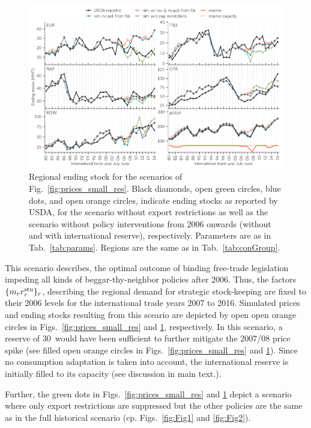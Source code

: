 \begin{figure}[htbp]
  \centering \includegraphics[width=.8\textwidth]{plots/no_policies_after_2006/Ending_stocks__MMT__1980_2017}
  \caption{Regional ending stock for the scenarios of Fig.~\ref{fig:prices_small_res}. Black
    diamonds, open green circles, blue dots, and open orange circles, indicate ending stocks as
    reported by USDA, for the scenario without export restrictions as well as the scenario without
    policy interventions from 2006 onwards (without and with international reserve),
    respectively. Parameters are as in Tab.~\ref{tab:params}. Regions are the same as in Tab.~\ref{tab:conGroup}.}
  \label{fig:stocks_small_res}
\end{figure}
This scenario describes, the optimal outcome of binding free-trade legislation impeding all kinds of
beggar-thy-neighbor policies after 2006. Thus, the factors $\lbrace m_rr^{\operatorname{stu}}_r\rbrace_r$, describing
the regional demand for strategic stock-keeping are fixed to their 2006 levels for the international
trade years 2007 to 2016. Simulated prices and ending stocks resulting from this sceario are
depicted by open open orange circles in Figs.~\ref{fig:prices_small_res} and
\ref{fig:stocks_small_res}, respectively. In this scenario, a reserve of 30\mmt~would have been
sufficient to further mitigate the 2007/08 price spike (see filled open orange circles in
Figs.~\ref{fig:prices_small_res} and \ref{fig:stocks_small_res}). Since no consumption adaptation is
taken into account, the international reserve is initially filled to its capacity (see
discussion in main text.).

Further, the green dots in Figs.~\ref{fig:prices_small_res} and \ref{fig:stocks_small_res} depict a
scenario where only export restrictions are suppressed but the other policies are the same as in the
full historical scenario (cp. Figs.~\ref{fig:Fig1} and \ref{fig:Fig2}).

